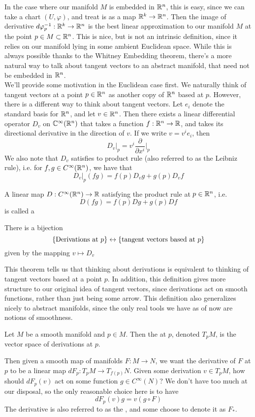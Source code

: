 In the case where our manifold $M$ is embedded in $\mathbb{R}^n$, this is easy, since we can take a chart $(U, \varphi)$, and treat is as a map $\mathbb{R}^k \to \mathbb{R}^n$. Then
the image of derivative $d\varphi^{-1}_p : \mathbb{R}^k \to \mathbb{R}^n$ is the best linear
approximation to our manifold $M$ at the point $p \in M \subset \mathbb{R}^n$. This
is nice, but is not an intrinsic definition, since it relies on our manifold
lying in some ambient Euclidean space. While this is always possible thanks
to the Whitney Embedding theorem, there's a more natural way to talk about
tangent vectors to an abstract manifold, that need not be embedded in $\mathbb{R}^n$.\\

We'll provide some motivation in the Euclidean case first. We naturally think
of tangent vectors at a point $p \in \mathbb{R}^n$ as another copy of $\mathbb{R}^n$
based at $p$. However, there is a different way to think about tangent vectors.
Let $e_i$ denote the standard basis for $\mathbb{R}^n$, and let $v \in \mathbb{R}^n$. Then
there exists a linear differential operator $D_v$ on $\mathbb{C}^\infty(\mathbb{R}^n)$ that
takes a function $f: \mathbb{R}^n \to \mathbb{R}$, and takes its directional derivative in the
direction of $v$. If we write $v = v^ie_i$, then
$$D_v\vert_p = v^i\frac{\partial}{\partial x^i}\vert_p $$
We also note that $D_v$ satisfies to product rule (also referred to as the Leibniz
rule), i.e. for $f,g \in C^\infty(\mathbb{R}^n)$, we have that
$$D_v\vert_p(fg) = f(p)D_vg + g(p)D_vf$$
\begin{defn}
	A linear map $D : C^\infty(\mathbb{R}^n) \to \mathbb{R}$ satisfying the product rule at $p \in \mathbb{R}^n$,
	i.e.
	$$D(fg) = f(p)Dg + g(p)Df$$
	is called a 
\end{defn}
%
\begin{thm}
	There is a bijection
	$$\left\lbrace \text{Derivations at } p \right\rbrace \leftrightarrow
	\left\lbrace \text{tangent vectors based at } p \right\rbrace  $$
	given by the mapping $v \mapsto D_v$
\end{thm}
%
This theorem tells us that thinking about derivations is equivalent to thinking
of tangent vectors based at a point $p$. In addition, this definition gives
more structure to our original idea of tangent vectors, since derivations act
on smooth functions, rather than just being some arrow. This definition also
generalizes nicely to abstract manifolds, since the only real tools we have
as of now are notions of smoothness.
%
\begin{defn}
	Let $M$ be a smooth manifold and $p \in M$. Then the  at
	$p$, denoted $T_pM$, is the vector space of derivations at $p$.
\end{defn}
%
Then given a smooth map of manifolds $F: M \to N$, we want the derivative of $F$
at $p$ to be a linear map $dF_p : T_pM \to T_{f(p)}N$. Given some derivation
$v \in T_pM$, how should $dF_p(v)$ act on some function $g \in C^\infty(N)$?
We don't have too much at our disposal, so the only reasonable choice here is
to have
$$dF_p(v)g = v(g \circ F) $$
The derivative is also referred to as the , and some choose
to denote it as $F_*$.\\

